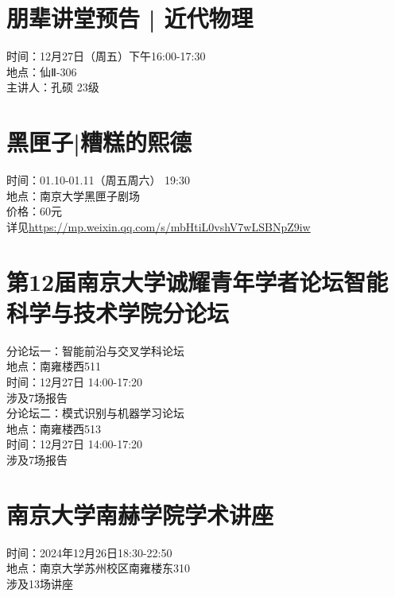 \documentclass[letterpaper, 12pt]{article}
\begin{document}
\begin{multicols}{2}
\section{朋辈讲堂预告 | 近代物理}
时间：12月27日（周五）下午16:00-17:30\\
地点：仙Ⅱ-306\\
主讲人：孔硕 23级\\

\section{黑匣子|糟糕的熙德}
时间：01.10-01.11（周五周六） 19:30\\
地点：南京大学黑匣子剧场\\
价格：60元\\
详见\url{https://mp.weixin.qq.com/s/mbHtiL0vshV7wLSBNpZ9iw}

\section{第12届南京大学诚耀青年学者论坛智能科学与技术学院分论坛}
分论坛一：智能前沿与交叉学科论坛\\
地点：南雍楼西511\\
时间：12月27日 14:00-17:20\\
涉及7场报告\\
分论坛二：模式识别与机器学习论坛\\
地点：南雍楼西513\\
时间：12月27日 14:00-17:20\\
涉及7场报告\\

\section{南京大学南赫学院学术讲座}
时间：2024年12月26日18:30-22:50\\
地点：南京大学苏州校区南雍楼东310\\
涉及13场讲座\\

\end{multicols} 
\end{document}
